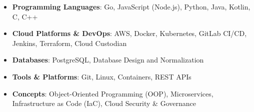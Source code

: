 \begin{itemize}
    \item \textbf{Programming Languages}: Go, JavaScript (Node.js), Python, Java, Kotlin, C, C++
    \item \textbf{Cloud Platforms \& DevOps}: AWS, Docker, Kubernetes, GitLab CI/CD, Jenkins, Terraform, Cloud Custodian
    \item \textbf{Databases}: PostgreSQL, Database Design and Normalization
    \item \textbf{Tools \& Platforms}: Git, Linux, Containers, REST APIs
    \item \textbf{Concepts}: Object-Oriented Programming (OOP), Microservices, Infrastructure as Code (IaC), Cloud Security & Governance
\end{itemize}
